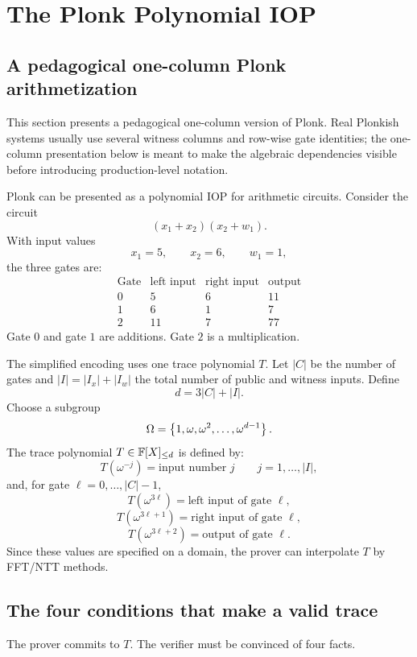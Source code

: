 ﻿\section{The Plonk Polynomial IOP}
\label{sec:plonk-iop}

\subsection{A pedagogical one-column Plonk arithmetization}

This section presents a pedagogical one-column version of Plonk. Real Plonkish systems usually use several witness columns and row-wise gate identities; the one-column presentation below is meant to make the algebraic dependencies visible before introducing production-level notation.

Plonk can be presented as a polynomial IOP for arithmetic circuits. Consider the circuit
\[
    (x_1+x_2)(x_2+w_1).
\]
With input values
\[
    x_1=5,
    \qquad
    x_2=6,
    \qquad
    w_1=1,
\]
the three gates are:
\[
\begin{array}{c|ccc}
\text{Gate} & \text{left input} & \text{right input} & \text{output}\\
\hline
0 & 5 & 6 & 11\\
1 & 6 & 1 & 7\\
2 & 11 & 7 & 77
\end{array}
\]
Gate $0$ and gate $1$ are additions. Gate $2$ is a multiplication.

The simplified encoding uses one trace polynomial $T$. Let $|C|$ be the number of gates and $|I|=|I_x|+|I_w|$ the total number of public and witness inputs. Define
\[
    d=3|C|+|I|.
\]
Choose a subgroup
\[
    \Omega=\left\{1,\omega,\omega^2,\ldots,\omega^{d-1}\right\}.
\]
The trace polynomial $T\in\mathbb{F}[X]_{\le d}$ is defined by:
\[
    T(\omega^{-j})=\text{input number }j
    \qquad j=1,\ldots,|I|,
\]
and, for gate $\ell=0,\ldots,|C|-1$,
\[
    T(\omega^{3\ell})=\text{left input of gate }\ell,
\]
\[
    T(\omega^{3\ell+1})=\text{right input of gate }\ell,
\]
\[
    T(\omega^{3\ell+2})=\text{output of gate }\ell.
\]
Since these values are specified on a domain, the prover can interpolate $T$ by FFT/NTT methods.

\subsection{The four conditions that make a valid trace}

The prover commits to $T$. The verifier must be convinced of four facts.

